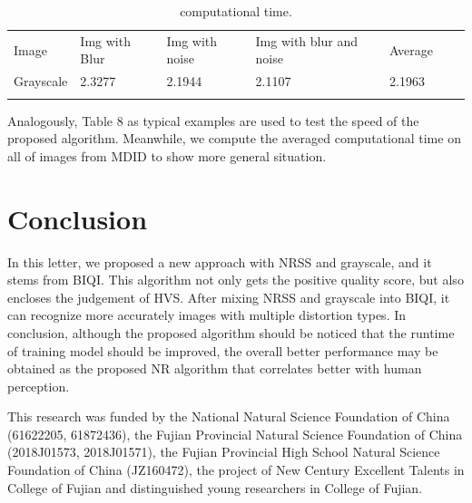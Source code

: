 \begin{table}
\caption{computational time.}
\label{tab:5}       
\begin{tabular}{lllllll}
\hline\noalign{\smallskip}
Image & Img with Blur & Img with noise & Img with blur and noise & Average &\\
\noalign{\smallskip}\hline\noalign{\smallskip}
Grayscale	&2.3277    &2.1944	&2.1107   	&2.1963		\\
\noalign{\smallskip}\hline
\end{tabular}
\end{table}


Analogously, Table 8 as typical examples are used to test the speed of the proposed algorithm. Meanwhile, we compute the averaged computational time on all of images from MDID to show more general situation.
\section{Conclusion}

In this letter, we proposed a new approach with NRSS and grayscale, and it stems from BIQI. This algorithm not only gets the positive quality score, but also encloses the judgement of HVS. After mixing NRSS and grayscale into BIQI, it can recognize more accurately images with multiple distortion types. In conclusion, although the proposed algorithm should be noticed that the runtime of training model should be improved, the overall better performance may be obtained as the proposed NR algorithm that correlates better with human perception. 






\begin{acknowledgements}
This research was funded by the National Natural Science Foundation of China (61622205, 61872436), the Fujian Provincial Natural Science Foundation of China (2018J01573, 2018J01571), the Fujian Provincial High School Natural Science Foundation of China (JZ160472), the project of New Century Excellent Talents in College of Fujian and distinguished young researchers in College of Fujian.
\end{acknowledgements}


